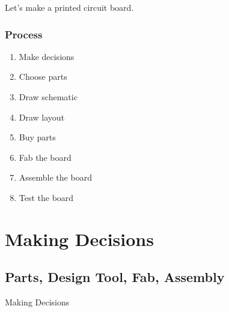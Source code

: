 \documentclass{beamer}
\begin{document}
\begin{frame}
\Huge{\centerline{Let's make a printed circuit board.}}
\end{frame}

\begin{frame}
\frametitle{Process}

\begin{enumerate}
\item Make decisions
\item Choose parts
\item Draw schematic
\item Draw layout
\item Buy parts
\item Fab the board
\item Assemble the board
\item Test the board
\end{enumerate}

\end{frame}

\section{Making Decisions} 
\subsection{Parts, Design Tool, Fab, Assembly} 
\begin{frame}
\Huge{\centerline{Making Decisions}}
\end{frame}
\end{document}

